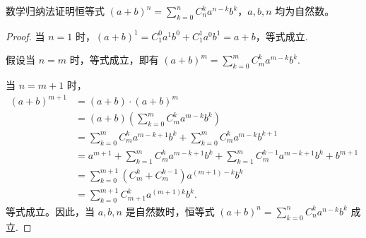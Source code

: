 \begin{example}
  数学归纳法证明恒等式 \((a + b)^n = \sum_{k=0}^n C_n^k a^{n-k}b^k\)，\(a, b, n\) 均为自然数。
\end{example}

\begin{proof}
当 \(n = 1\) 时，\((a + b)^1 = C_{1}^{0} a^{1} b^{0} + C_{1}^{1} a^{0} b^{1} = a + b\)，等式成立. 

假设当 \(n = m\) 时，等式成立，即有 \((a + b)^m = \sum_{k = 0}^{m} C_{m}^{k} a^{m - k} b^{k}\). 

当 \(n = m + 1\) 时，
\begin{align*}
(a + b)^{m + 1} &= (a + b) \cdot (a + b)^m \\
&= (a + b) \left( \sum_{k = 0}^{m} C_{m}^{k} a^{m - k} b^{k} \right) \\
&= \sum_{k = 0}^{m} C_{m}^{k} a^{m - k + 1} b^{k} + \sum_{k = 0}^{m} C_{m}^{k} a^{m - k} b^{k + 1} \\
&= a^{m + 1} + \sum_{k = 1}^{m} C_{m}^{k} a^{m - k + 1} b^{k} + \sum_{k = 1}^{m} C_{m}^{k - 1} a^{m - k + 1} b^{k} + b^{m + 1} \\
&= \sum_{k = 0}^{m + 1} \left( C_{m}^{k} + C_{m}^{k - 1} \right) a^{(m + 1) - k} b^{k} \\
&= \sum_{k = 0}^{m + 1} C_{m + 1}^{k} a^{(m + 1) k} b^{k}. 
\end{align*}
等式成立。因此，当 \(a,b,n\) 是自然数时，恒等式 \((a + b)^n = \sum_{k = 0}^{n} C_{n}^{k} a^{n - k} b^{k}\) 成立. 
\end{proof}




